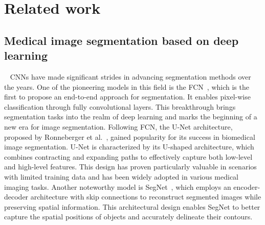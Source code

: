\documentclass[review]{elsarticle}
\begin{document}
	\section{Related work}
	\label{section:rw}
	\subsection{Medical image segmentation based on deep learning}
 	CNNs have made significant strides in advancing segmentation methods over the years. One of the pioneering models in this field is the FCN~\cite{long2015fully}, which is the first to propose an end-to-end approach for segmentation. It enables pixel-wise classification through fully convolutional layers. This breakthrough brings segmentation tasks into the realm of deep learning and marks the beginning of a new era for image segmentation. Following FCN, the U-Net architecture, proposed by Ronneberger et al.~\cite{ronneberger2015u}, gained popularity for its success in biomedical image segmentation. U-Net is characterized by its U-shaped architecture, which combines contracting and expanding paths to effectively capture both low-level and high-level features. This design has proven particularly valuable in scenarios with limited training data and has been widely adopted in various medical imaging tasks. Another noteworthy model is SegNet~\cite{badrinarayanan2017segnet}, which employs an encoder-decoder architecture with skip connections to reconstruct segmented images while preserving spatial information. This architectural design enables SegNet to better capture the spatial positions of objects and accurately delineate their contours.
\end{document}
